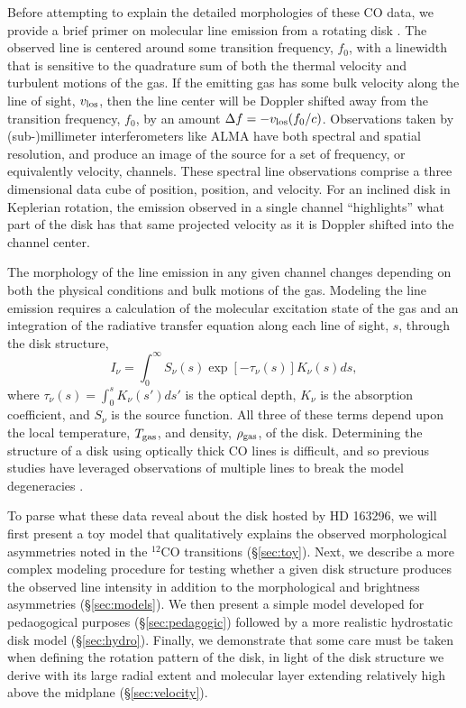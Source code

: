 Before attempting to explain the detailed morphologies of these CO data, we 
provide a brief primer on molecular line emission from a rotating disk
\citep[e.g.][]{omodaka92,beckwith93}.  The observed line is centered around some
transition frequency, $f_0$, with a linewidth that is sensitive to the 
quadrature sum of both the thermal velocity and turbulent motions of the gas.  
If the emitting gas has some bulk velocity along the line of sight, 
$v_{\rm los}$, then the line center will be Doppler shifted away from the 
transition frequency, $f_0$, by an amount $\Delta f = -v_{\rm los}(f_0/c)$.  
Observations taken by (sub-)millimeter interferometers like ALMA have both 
spectral and spatial resolution, and produce an image of the source for a set of
frequency, or equivalently velocity, channels.  These spectral line observations
comprise a three dimensional data cube of position, position, and velocity.  For
an inclined disk in Keplerian rotation, the emission observed in a single 
channel ``highlights'' what part of the disk has that same projected velocity as
it is Doppler shifted into the channel center.  

The morphology of the line emission in any given channel changes depending on 
both the physical conditions and bulk motions of the gas.  Modeling the line 
emission requires a calculation of the molecular excitation state of the gas and
an integration of the radiative transfer equation along each line of sight, $s$,
through the disk structure,
\begin{equation}
I_\nu = \int_0^\infty S_\nu(s) \exp\left[-\tau_\nu(s)\right] K_\nu(s) ds,
\label{eq:radiativetransfer}
\end{equation}
where $\tau_\nu(s) = \int_0^s K_\nu(s')ds'$ is the optical depth, $K_\nu$ is the
absorption coefficient, and $S_\nu$ is the source function.  All three of these 
terms depend upon the local temperature, $T_{\rm gas}$, and density, 
$\rho_{\rm gas}$, of the disk.  Determining the structure of a disk using 
optically thick CO lines is difficult, and so previous studies have leveraged 
observations of multiple lines to break the model degeneracies 
\citep{dartois03,pietu07}.

To parse what these data reveal about the disk hosted by HD 163296,
we will first present a toy model that qualitatively explains the observed 
morphological asymmetries noted in the $^{12}$CO transitions (\S\ref{sec:toy}).
Next, we describe a more complex modeling procedure for testing whether a given
disk structure produces the observed line intensity in addition to the 
morphological and brightness asymmetries (\S\ref{sec:models}).  We then present 
a simple model developed for pedaogogical purposes (\S\ref{sec:pedagogic}) 
followed by a more realistic hydrostatic disk model (\S\ref{sec:hydro}).  
Finally, we demonstrate that some care must be taken when defining the rotation 
pattern of the disk, in light of the disk structure we derive with its large 
radial extent and molecular layer extending relatively high above the midplane 
(\S\ref{sec:velocity}).

